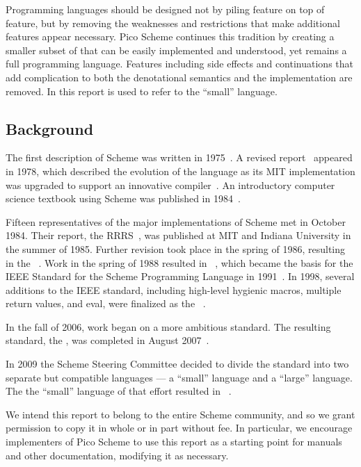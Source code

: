 
\label{historysection}

Programming languages should be designed not by piling feature on top
of feature, but by removing the weaknesses and restrictions that make
additional features appear necessary.  Pico Scheme continues this
tradition by creating a smaller subset of \rsevenrs{} that can be easily
implemented and understood, yet remains a full programming
language. Features including side effects and continuations that add
complication to both the denotational semantics and the implementation
are removed. In this report \rsevenrs{} is used to refer to the ``small''
language.


\subsection*{Background}

\vest The first description of Scheme was written in
1975~\cite{Scheme75}.  A revised report~\cite{Scheme78}
appeared in 1978, which described the evolution
of the language as its MIT implementation was upgraded to support an
innovative compiler~\cite{Rabbit}. An introductory
computer science textbook using Scheme was published in
1984~\cite{SICP}.

\vest Fifteen representatives of the major implementations of Scheme
met in October 1984.
Their report, the RRRS~\cite{RRRS},
was published at MIT and Indiana University in the summer of 1985.
Further revision took place in the spring of 1986, resulting in the
\rthreers~\cite{R3RS}.
Work in the spring of 1988 resulted in \rfourrs~\cite{R4RS},
which became the basis for the
IEEE Standard for the Scheme Programming Language in 1991~\cite{IEEEScheme}.
In 1998, several additions to the IEEE standard, including high-level
hygienic macros, multiple return values, and {\cf eval}, were finalized
as the \rfivers~\cite{R5RS}.

In the fall of 2006, work began on a more ambitious standard.
The resulting standard, the
\rsixrs, was completed in August 2007~\cite{R6RS}.

In 2009 the Scheme Steering Committee decided to divide the
standard into two separate but compatible languages --- a ``small''
language and a ``large'' language.
The the ``small'' language of that effort resulted in \rsevenrs~\cite{R7RS}.


\medskip

We intend this report to belong to the entire Scheme community, and so
we grant permission to copy it in whole or in part without fee.  In
particular, we encourage implementers of Pico Scheme to use this report as
a starting point for manuals and other documentation, modifying it as
necessary.




